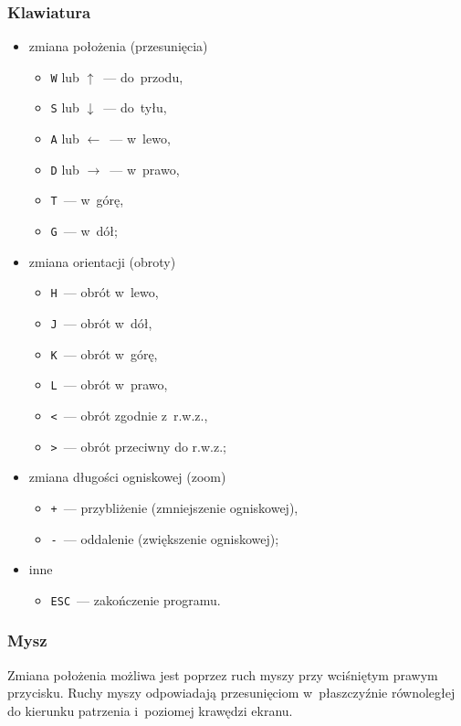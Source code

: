 \documentclass[12pt,a4paper]{article}
\begin{document}
\subsubsection{Klawiatura}
\begin{itemize}
    \addtolength{\itemsep}{-0.5\baselineskip}
  \item zmiana położenia (przesunięcia)
    \begin{itemize}
      \item \texttt{W} lub $\uparrow$~--- do~przodu,
      \item \texttt{S} lub $\downarrow$~--- do~tyłu,
      \item \texttt{A} lub $\leftarrow$~--- w~lewo,
      \item \texttt{D} lub $\rightarrow$~--- w~prawo,
      \item \texttt{T}~--- w~górę,
      \item \texttt{G}~--- w~dół;
    \end{itemize}
  \item zmiana orientacji (obroty)
    \begin{itemize}
      \item \texttt{H}~--- obrót w~lewo,
      \item \texttt{J}~--- obrót w~dół,
      \item \texttt{K}~--- obrót w~górę,
      \item \texttt{L}~--- obrót w~prawo,
      \item \texttt{<}~--- obrót zgodnie z~r.w.z.,
      \item \texttt{>}~--- obrót przeciwny do r.w.z.;
    \end{itemize}
  \item zmiana długości ogniskowej (zoom)
    \begin{itemize}
      \item \texttt{+}~--- przybliżenie (zmniejszenie ogniskowej),
      \item \texttt{-}~--- oddalenie (zwiększenie ogniskowej);
    \end{itemize}
  \item inne
    \begin{itemize}
      \item \texttt{ESC}~--- zakończenie programu.
    \end{itemize}
\end{itemize}

\subsubsection{Mysz}
Zmiana położenia możliwa jest poprzez ruch myszy przy wciśniętym
prawym przycisku. Ruchy myszy odpowiadają przesunięciom w~płaszczyźnie równoległej
do kierunku patrzenia i~poziomej krawędzi ekranu.
\end{document}
